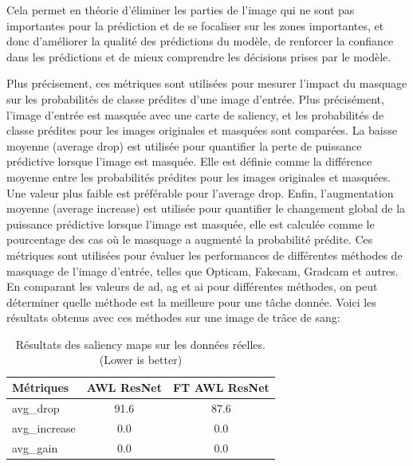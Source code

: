 Cela permet en théorie d'éliminer les parties de l'image qui ne sont pas importantes pour la prédiction et de se focaliser sur les zones importantes, et
donc d'améliorer la qualité des prédictions du modèle, de renforcer la confiance dans les prédictions et de mieux comprendre les décisions prises par le modèle.


Plus précisement, ces métriques sont utilisées pour mesurer l'impact du masquage sur les probabilités de classe prédites d'une image d'entrée. Plus précisément, l'image d'entrée est masquée avec une carte de saliency, et les probabilités de classe prédites pour les images originales et masquées sont comparées.
La baisse moyenne (average drop) est utilisée pour quantifier la perte de puissance prédictive lorsque l'image est masquée. Elle est définie comme la différence moyenne entre les probabilités prédites pour les images originales et masquées. Une valeur plus faible est préférable pour l'average drop.
Enfin, l'augmentation moyenne (average increase) est utilisée pour quantifier le changement global de la puissance prédictive lorsque l'image est masquée, elle est calculée comme le pourcentage des cas où le masquage a augmenté la probabilité prédite. 
Ces métriques sont utilisées pour évaluer les performances de différentes méthodes de masquage de l'image d'entrée, telles que Opticam, Fakecam, Gradcam et autres. En comparant les valeurs de ad, ag et ai pour différentes méthodes, on peut déterminer quelle méthode est la meilleure pour une tâche donnée.
Voici les résultats obtenus avec ces méthodes sur une image de trâce de sang:

\begin{table}[h]
    \centering
    \begin{tabular}{lcc}
        \toprule
        Métriques & AWL ResNet & FT AWL ResNet \\
        \midrule
        avg\_drop & 91.6 & 87.6 \\
        avg\_increase & 0.0 & 0.0 \\
        avg\_gain & 0.0 & 0.0 \\
        \bottomrule
        \end{tabular}
    \caption{Résultats des saliency maps sur les données réelles. (Lower is better)}
    \label{tab:saliency_results}
\end{table}

